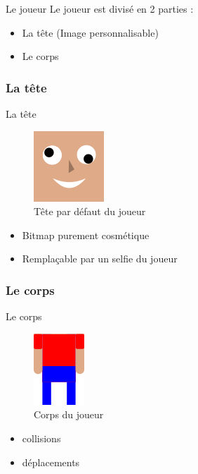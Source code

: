 \documentclass[t,12pt]{beamer}
\begin{document}
\begin{frame}{Le joueur}
    Le joueur est divisé en 2 parties :
    \begin{itemize}
        \item La tête (Image personnalisable)
        \item Le corps
    \end{itemize}
    
\end{frame}

\subsubsection{La tête}
\begin{frame}{La tête}
    \begin{figure}
        \centering
        \includegraphics{face}
        \caption{Tête par défaut du joueur}
        \label{fig:tete_joueur}
    \end{figure}
    \begin{itemize}
        \item Bitmap purement cosmétique
        \item Remplaçable par un selfie du joueur
    \end{itemize}
\end{frame}

\subsubsection{Le corps}
\begin{frame}{Le corps}
    \begin{figure}
        \centering
        \includegraphics{corps_joueur}
        \caption{Corps du joueur}
        \label{fig:corps_du_joueur}
    \end{figure}
    \begin{itemize}
        \item collisions
        \item déplacements
    \end{itemize}
\end{frame}
\end{document}
